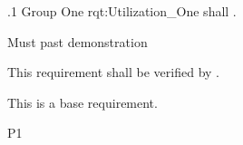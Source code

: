 \ONERQMTV
{\RqtNumberBase.1}
{Group One}
{rqt:Utilization_One}
{\ThisSys shall \TBD.}
{
	\item [Phase 1] Must past demonstration
}
{This requirement shall be verified by \TBD.}
{
\item [N/A] This is a base requirement.
}
{
	\item \TBD
}
{P1}

